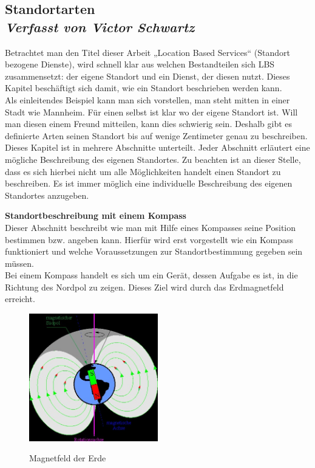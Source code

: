 \subsection[Standortarten]{Standortarten
 \\ \textnormal{\small{\textit {Verfasst von Victor Schwartz}}}}

Betrachtet man den Titel dieser Arbeit „Location Based Services“ (Standort bezogene Dienste), wird schnell klar aus welchen Bestandteilen sich LBS zusammensetzt: der eigene Standort und ein Dienst, der diesen nutzt. Dieses Kapitel beschäftigt sich damit, wie ein Standort beschrieben werden kann.
\\Als einleitendes Beispiel kann man sich vorstellen, man steht mitten in einer Stadt wie Mannheim. Für einen selbst ist klar wo der eigene Standort ist. Will man diesen einem Freund mitteilen, kann dies schwierig sein. Deshalb gibt es definierte Arten seinen Standort bis auf wenige Zentimeter genau zu beschreiben. Dieses Kapitel ist in mehrere Abschnitte unterteilt. Jeder Abschnitt erläutert eine mögliche Beschreibung des eigenen Standortes.
Zu beachten ist an dieser Stelle, dass es sich hierbei nicht um alle Möglichkeiten handelt einen Standort zu beschreiben. Es ist immer möglich eine individuelle Beschreibung des eigenen Standortes anzugeben. 

\textbf{Standortbeschreibung mit einem Kompass}
\\Dieser Abschnitt beschreibt wie man mit Hilfe eines Kompasses seine Position bestimmen bzw. angeben kann. Hierfür wird erst vorgestellt wie ein Kompass funktioniert und welche Voraussetzungen zur Standortbestimmung gegeben sein müssen.
\\Bei einem Kompass handelt es sich um ein Gerät, dessen Aufgabe es ist, in die Richtung des Nordpol zu zeigen. Dieses Ziel wird durch das Erdmagnetfeld erreicht.


\begin{figure}[ht]
  \centering
    \includegraphics[width=0.50\textwidth]{ref/images/magnetfeld.jpg}
   \caption{Magnetfeld der Erde}
  \label{fig:Magnetfeld}
  \cite{Magnetfeld}
\end{figure}



